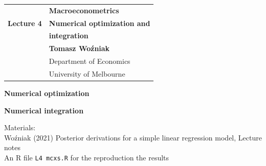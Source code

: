 \documentclass[notes,blackandwhite,mathsans]{beamer}
\begin{document}






{
\begin{frame}

\vspace{1cm}
\begin{tabular}{rl}
&\textbf{\LARGE\color{mcxs1} Macroeconometrics}\\[8ex]
\textbf{\Large\color{mcxs5} Lecture 4}&\textbf{\Large\color{mcxs2}Numerical optimization and}\\
&\textbf{\Large\color{mcxs2}integration}\\[17ex]
&\textbf{\color{mcxs2}Tomasz Wo\'zniak}\\[1ex]
&{\small\color{mcxs5} Department of Economics}\\
&{\small\color{mcxs5}University of Melbourne}
\end{tabular}

\end{frame}
}





{
\begin{frame}

\vspace{1cm} \textbf{\color{mcxs1}Numerical optimization}

\bigskip\textbf{\color{mcxs2}Numerical integration}

%

\bigskip\normalsize Materials:\\ \footnotesize
{\color{mcxs2}Wo\'zniak (2021) Posterior derivations for a simple linear regression model, Lecture notes}\\
{\color{mcxs2}An R file} \texttt{L4 mcxs.R} {\color{mcxs2}for the reproduction the results}

\end{frame}
}
\end{document}
